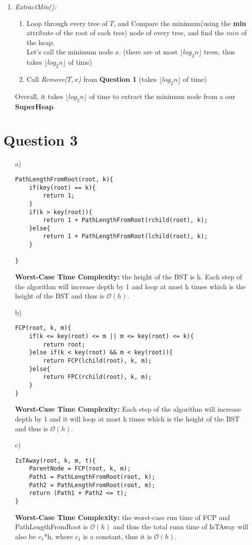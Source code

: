 \documentclass[10pt]{article}
\begin{document}
\begin{enumerate}
\begin{enumerate}
\item \textit{ExtractMin():}
\begin{enumerate}
\item Loop through every tree of $T$, and Compare the minimum(using the \textbf{min} attribute of the root of each tree) node of every tree, and find the $min$ of the heap. \\Let's call the minimum node $x$. \null\hfill (there are at most $\lfloor log_2n \rfloor$ trees, thus takes $\lfloor log_2n \rfloor$ of time)
\item Call \textit{Remove($T, x$)} from \textbf{Question 1} \null\hfill (takes $\lfloor log_2n \rfloor$ of time)
\end{enumerate}
Overall, it takes $\lfloor log_2n \rfloor$ of time to extract the minimum node from a our \textbf{SuperHeap}.
\end{enumerate}
\end{enumerate}
\newpage

\section*{Question 3}
\begin{itemize}
\item[a)]
\begin{lstlisting}[frame=single]
PathLengthFromRoot(root, k){
    if(key(root) == k){
        return 1;    
    }
    if(k > key(root)){
		return 1 + PathLengthFromRoot(rchild(root), k);
    }else{
		return 1 + PathLengthFromRoot(lchild(root), k);
    }

}
\end{lstlisting}
\textbf{Worst-Case Time Complexity:} the height of the BST is h. Each step of the algorithm will increase depth by 1 and loop at most h times which is the height of the BST and thus is $\mathcal{O}(h)$.
\item[b)]
\begin{lstlisting}[frame=single]
FCP(root, k, m){
    if(k <= key(root) <= m || m <= key(root) <= k){
		return root;    
    }else if(k < key(root) && m < key(root)){
		return FCP(lchild(root), k, m);    
    }else{
		return FPC(rchild(root), k, m);    
    }
}
\end{lstlisting}
\textbf{Worst-Case Time Complexity:} Each step of the algorithm will increase depth by 1 and it will loop at most h times which is the height of the BST and thus is $\mathcal{O}(h)$.

\item[c)]
\begin{lstlisting}[frame=single]
IsTAway(root, k, m, t){
    ParentNode = FCP(root, k, m);
    Path1 = PathLengthFromRoot(root, k);
    Path2 = PathLengthFromRoot(root, m);
    return (Path1 + Path2 <= t);
}
\end{lstlisting}
\textbf{Worst-Case Time Complexity:} the worst-case run time of FCP and PathLengthFromRoot is $\mathcal{O}(h)$ and thus the total runn time of IsTAway will also be $c_1$*h, where $c_1$ is a constant, thus it is $\mathcal{O}(h)$.
\end{itemize}
\end{document}
